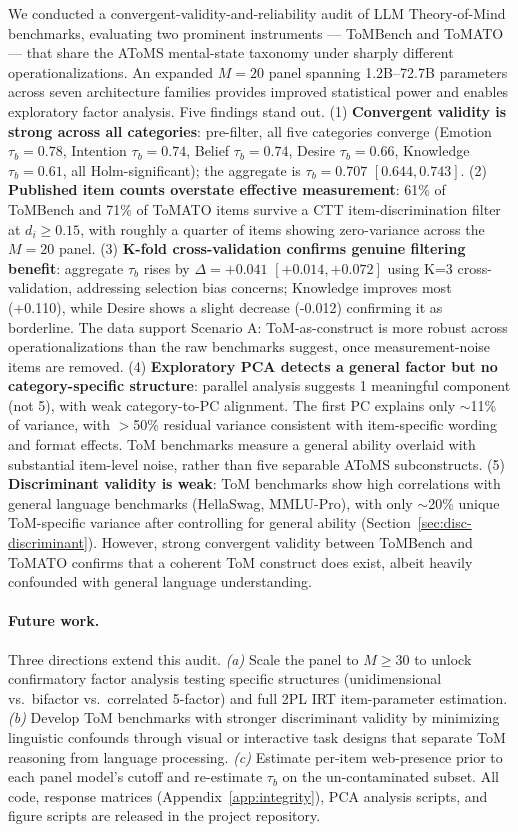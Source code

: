 \documentclass{article} %
\begin{document}
We conducted a convergent-validity-and-reliability audit of LLM Theory-of-Mind benchmarks, evaluating two prominent instruments --- ToMBench and ToMATO --- that share the AToMS mental-state taxonomy under sharply different operationalizations. An expanded $M=20$ panel spanning 1.2B--72.7B parameters across seven architecture families provides improved statistical power and enables exploratory factor analysis. Five findings stand out. (1) \textbf{Convergent validity is strong across all categories}: pre-filter, all five categories converge (Emotion $\tau_b=0.78$, Intention $\tau_b=0.74$, Belief $\tau_b=0.74$, Desire $\tau_b=0.66$, Knowledge $\tau_b=0.61$, all Holm-significant); the aggregate is $\tau_b=0.707$ $[0.644, 0.743]$. (2) \textbf{Published item counts overstate effective measurement}: 61\% of ToMBench and 71\% of ToMATO items survive a CTT item-discrimination filter at $d_i\ge 0.15$, with roughly a quarter of items showing zero-variance across the $M=20$ panel. (3) \textbf{K-fold cross-validation confirms genuine filtering benefit}: aggregate $\tau_b$ rises by $\Delta=+0.041$ $[+0.014, +0.072]$ using K=3 cross-validation, addressing selection bias concerns; Knowledge improves most (+0.110), while Desire shows a slight decrease (-0.012) confirming it as borderline. The data support Scenario A: ToM-as-construct is more robust across operationalizations than the raw benchmarks suggest, once measurement-noise items are removed. (4) \textbf{Exploratory PCA detects a general factor but no category-specific structure}: parallel analysis suggests 1 meaningful component (not 5), with weak category-to-PC alignment. The first PC explains only $\sim$11\% of variance, with $>$50\% residual variance consistent with item-specific wording and format effects. ToM benchmarks measure a general ability overlaid with substantial item-level noise, rather than five separable AToMS subconstructs. (5) \textbf{Discriminant validity is weak}: ToM benchmarks show high correlations with general language benchmarks (HellaSwag, MMLU-Pro), with only $\sim$20\% unique ToM-specific variance after controlling for general ability (Section~\ref{sec:disc-discriminant}). However, strong convergent validity between ToMBench and ToMATO confirms that a coherent ToM construct does exist, albeit heavily confounded with general language understanding.

\paragraph{Future work.} Three directions extend this audit. \emph{(a)} Scale the panel to $M\ge 30$ to unlock confirmatory factor analysis testing specific structures (unidimensional vs.\ bifactor vs.\ correlated 5-factor) and full 2PL IRT item-parameter estimation. \emph{(b)} Develop ToM benchmarks with stronger discriminant validity by minimizing linguistic confounds through visual or interactive task designs that separate ToM reasoning from language processing. \emph{(c)} Estimate per-item web-presence prior to each panel model's cutoff and re-estimate $\tau_b$ on the un-contaminated subset. All code, response matrices (Appendix~\ref{app:integrity}), PCA analysis scripts, and figure scripts are released in the project repository.
\end{document}
